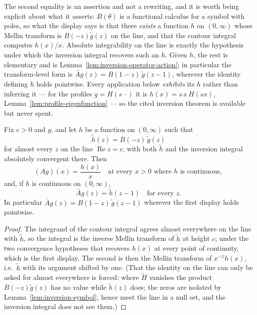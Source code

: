 The second equality is an assertion and not a rewriting, and it is worth being explicit about
what it asserts: $B(\theta)$ is a functional calculus for a symbol with poles, so what the
display says is that there \emph{exists} a function $h$ on $(0,\infty)$ whose Mellin transform is
$B(-z)\tilde g(z)$ on the line, and that the contour integral computes $h(x)/x$. Absolute
integrability on the line is exactly the hypothesis under which the inversion integral recovers
such an $h$. Given $h$, the rest is elementary and is Lemma~\ref{lem:inversion-operator-action};
in particular the transform-level form is $\widetilde{A g}(z) = B(1 - z)\,\tilde g(z - 1)$,
wherever the identity defining $h$ holds pointwise. Every application below \emph{exhibits} its
$h$ rather than inferring it --- for the profiles $g = H(s\,\cdot)$ it is $h(x) = s\,x\,H(sx)$,
Lemma~\ref{lem:profile-eigenfunction} --- so the cited inversion theorem is available but never
spent.

\begin{lemma}\label{lem:inversion-operator-action}
Fix $c > 0$ and $g$, and let $h$ be a function on $(0,\infty)$ such that
\[
  \tilde h(z) = B(-z)\,\tilde g(z)
\]
for almost every $z$ on the line $\operatorname{Re} z = c$, with both $\tilde h$ and the
inversion integral absolutely convergent there. Then
\[
  (A g)(x) = \frac{h(x)}{x} \quad\text{at every } x > 0 \text{ where } h \text{ is continuous},
\]
and, if $h$ is continuous on $(0,\infty)$,
\[
  \widetilde{A g}(z) = \tilde h(z-1) \quad\text{for every } z .
\]
In particular $\widetilde{A g}(z) = B(1-z)\,\tilde g(z-1)$ wherever the first display holds
pointwise.
\end{lemma}

\begin{proof}
The integrand of the contour integral agrees almost everywhere on the line with $\tilde h$, so
the integral is the inverse Mellin transform of $\tilde h$ at height $c$; under the two
convergence hypotheses that recovers $h(x)$ at every point of continuity, which is the first
display. The second is then the Mellin transform of $x^{-1}h(x)$, i.e.\ $\tilde h$ with its
argument shifted by one. (That the identity on the line can only be asked for almost
everywhere is forced: where $\tilde H$ vanishes the product $B(-z)\tilde g(z)$ has no value
while $\tilde h(z)$ does; the zeros are isolated by Lemma~\ref{lem:inversion-symbol}, hence
meet the line in a null set, and the inversion integral does not see them.)
\end{proof}

